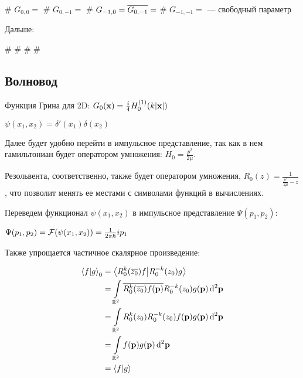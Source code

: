 \begin{ilist}
# $G_{0, 0} = $ 
# $G_{0, -1} = $ 
# $G_{-1, 0} = \overline{G_{0, -1}} = $ 
# $G_{-1, -1} = $ — свободный параметр 
\end{ilist}

Дальше:

\begin{elist}
# 
# 
# 
# 
\end{elist}


\subsection{Волновод}







Функция Грина для 2D: $G_0(\vb{x}) = \frac{i}{4} H_0^{(1)}(k |\vb{x}|)$




$\psi(x_1, x_2) = \delta'(x_1) \delta(x_2)$

Далее будет удобно перейти в импульсное представление, так как в нем гамильтониан будет оператором умножения: $H_0 = \frac{p^2}{2 \mu}$.

Резольвента, соответственно, также будет оператором умножения, $R_0(z) = \frac{1}{\frac{p^2}{2 \mu} - z}$, что позволит менять ее местами с символами функций в вычислениях.

Переведем функционал $\psi(x_1, x_2)$ в импульсное представление $\Psi(p_1, p_2)$:

$\Psi(p_1, p_2) = \mathcal{F}(\psi(x_1, x_2)) = \frac{1}{2 \pi \hbar} i p_1$

Также упрощается частичное скалярное произведение:

\begin{align*}
\ip{f}{g}_0
&= \ip{R_0^k(\cconj{z_0}) f}{R_0^{-k}(z_0) g} \\
&= \int\limits_{\bbR^2} \cconj{R_0^k(\cconj{z_0}) f(\vb{p})} R_0^{-k}(z_0) g(\vb{p}) \dd[2]{\vb{p}} \\
&= \int\limits_{\bbR^2} R_0^k(z_0) R_0^{-k}(z_0) f(\vb{p}) g(\vb{p}) \dd[2]{\vb{p}} \\
&= \int\limits_{\bbR^2} f(\vb{p}) g(\vb{p}) \dd[2]{\vb{p}} \\
&= \ip{f}{g}
\end{align*}

